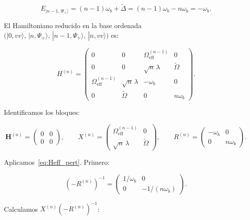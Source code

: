 \documentclass[12pt]{article}
\begin{document}
	\begin{equation}
		E_{|n-1,\,\Psi_+\rangle} = (n-1)\omega_b + \widetilde{\Delta}
		= (n-1)\omega_b - n\omega_b = -\omega_b.
	\end{equation}
	
	\noindent
	El Hamiltoniano reducido en la base ordenada
	$\bigl(|0,vv\rangle,\, |n,\Psi_+\rangle,\, |n-1,\Psi_+\rangle,\,
	|n,vv\rangle\bigr)$ es:
	
	\begin{equation}
		H^{(n)} = \begin{pmatrix}
			0 & 0 & \Omega_{\mathrm{eff}}^{(n-1)} & 0 \\[4pt]
			0 & 0 & \sqrt{n}\,\lambda & \widetilde{\Omega} \\[4pt]
			\Omega_{\mathrm{eff}}^{(n-1)} & \sqrt{n}\,\lambda & -\omega_b & 0 \\[4pt]
			0 & \widetilde{\Omega} & 0 & n\omega_b
		\end{pmatrix}.
		\label{eq:Hn_recursivo}
	\end{equation}
	
	\noindent
	Identificamos los bloques:
	
	\begin{equation}
		\mathbf{H}^{(n)} = \begin{pmatrix} 0 & 0 \\ 0 & 0 \end{pmatrix}, \qquad
		X^{(n)} = \begin{pmatrix}
			\Omega_{\mathrm{eff}}^{(n-1)} & 0 \\[4pt]
			\sqrt{n}\,\lambda & \widetilde{\Omega}
		\end{pmatrix}, \qquad
		R^{(n)} = \begin{pmatrix} -\omega_b & 0 \\ 0 & n\omega_b \end{pmatrix}.
		\label{eq:bloques_n}
	\end{equation}
	
	\noindent
	Aplicamos~\eqref{eq:Heff_pert}. Primero:
	
	\begin{equation}
		\left(-R^{(n)}\right)^{-1}
		= \begin{pmatrix} 1/\omega_b & 0 \\ 0 & -1/(n\omega_b) \end{pmatrix}.
	\end{equation}
	
	\noindent
	Calculamos $X^{(n)}(-R^{(n)})^{-1}$:
	
\end{document}
